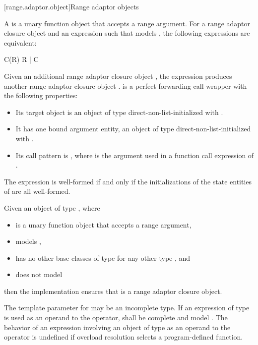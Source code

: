 [range.adaptor.object]{Range adaptor objects}

\pnum
A  is a unary function object that accepts
a range argument. For
a range adaptor closure object  and an expression  such that
 models , the following
expressions are equivalent:
\begin{codeblock}
C(R)
R | C
\end{codeblock}
Given an additional range adaptor closure object ,
the expression  produces another range adaptor
closure object .
 is a perfect forwarding call wrapper
with the following properties:
\begin{itemize}
\item
Its target object is an object  of type 
direct-non-list-initialized with .
\item
It has one bound argument entity,
an object  of type 
direct-non-list-initialized with .
\item
Its call pattern is ,
where  is the argument used in
a function call expression of .
\end{itemize}
The expression  is well-formed if and only if
the initializations of the state entities of  are all well-formed.

\pnum
Given an object  of type , where
\begin{itemize}
\item
{} is a unary function object that accepts a range argument,
\item
{} models ,
\item
{} has no other base classes of type  for any other type , and
\item
{} does not model 
\end{itemize}
then the implementation ensures
that  is a range adaptor closure object.

\pnum
The template parameter  for 
may be an incomplete type.
If an expression of type \cv{} 
is used as an operand to the \tcode{|} operator,
 shall be complete and
model .
The behavior of an expression involving an object of type \cv{} 
as an operand to the \tcode{|} operator is undefined
if overload resolution selects a program-defined  function.

